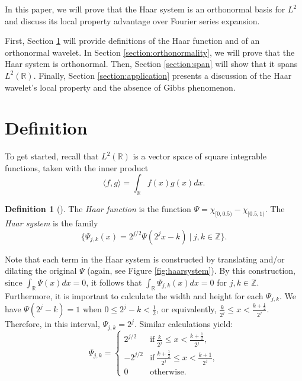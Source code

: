 \documentclass[11pt]{amsart}
\theoremstyle{theorem} %
\theoremstyle{definition}
\newtheorem{defn}[thm]{Definition}
\theoremstyle{example}
\theoremstyle{remark}
\numberwithin{equation}{section}
\newcommand{\R}{\mathbb{R}}
\newcommand{\Z}{\mathbb{Z}}
\begin{document}
In this paper, we will prove that the Haar system is an orthonormal basis for $ L^2 $ and discuss its local property advantage over Fourier series expansion.

First, Section \ref{section:def} will provide definitions of the Haar function and of an orthonormal wavelet. In Section \ref{section:orthonormality}, we will prove that the Haar system is orthonormal. Then, Section \ref{section:span} will show that it spans $ L^2(\R) $. Finally, Section \ref{section:application} presents a discussion of the Haar wavelet's local property and the absence of Gibbs phenomenon.

\section{Definition} \label{section:def}
To get started, recall that \emph{$ L^2(\R) $} is a vector space of square integrable functions, taken with the inner product
\[ \langle f,g \rangle = \int_{\R} f(x) g(x)  dx. \]

\begin{defn}[{\cite[515]{davidson}}] \label{haar}
	The \emph{Haar function} is the function $ \varPsi = \chi_{[0,0.5)} - \chi_{[0.5,1)} $. The \emph{Haar system} is the family
	\[ \{ \varPsi_{j,k}(x) = 2^{j/2} \varPsi (2^j x-k) \ | \ j,k \in \Z \}. \]
\end{defn}

	Note that each term in the Haar system is constructed by translating and/or dilating the original $ \varPsi $ (again, see Figure \ref{fig:haarsystem}). By this construction, since $ \int_{\R} \varPsi(x)dx = 0 $, it follows that $ \int_{\R} \varPsi_{j,k}(x)dx = 0 $ for $ j,k \in \Z $.
	Furthermore, it is important to calculate the width and height for each $ \varPsi_{j,k} $. We have $ \varPsi(2^j - k) = 1 $ when $ 0 \leq 2^j - k < \frac{1}{2} $, or equivalently, $ \frac{k}{2^j} \leq x < \frac{k+\frac{1}{2}}{2^j} $. Therefore, in this interval, $ \varPsi_{j,k} = 2^j $. Similar calculations yield:
	\begin{equation} \label{eq:height}
		\varPsi_{j,k} = 
		\begin{cases}
		2^{j/2} &\text{if}\ \frac{k}{2^j} \leq x < \frac{k+\frac{1}{2}}{2^j}, \\
		-2^{j/2} &\text{if}\ \frac{k+\frac{1}{2}}{2^j} \leq x < \frac{k+1}{2^j}, \\
		0 &\text{otherwise}.
		\end{cases}
	\end{equation}
	
\end{document}
